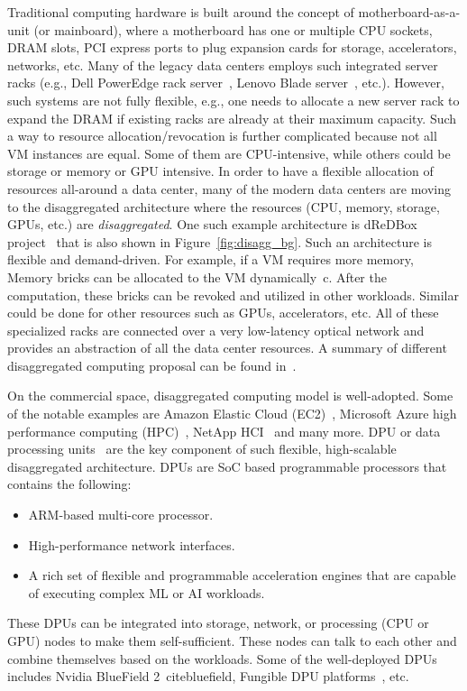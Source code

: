 Traditional computing hardware is built around the concept of motherboard-as-a-unit (or mainboard), where a motherboard has one or multiple CPU sockets, DRAM slots, PCI express ports to plug expansion cards for storage, accelerators, networks, etc. Many of the legacy data centers employs such integrated server racks  (e.g., Dell PowerEdge rack server~\cite{rack_server_dell}, Lenovo Blade server~\cite{rack_server_lenovo}, etc.). However, such systems are not fully flexible, e.g., one needs to allocate a new server rack to expand the DRAM if existing racks are already at their maximum capacity. Such a way to resource allocation/revocation is further complicated because not all VM instances are equal. Some of them are CPU-intensive, while others could be storage or memory or GPU intensive. In order to have a flexible allocation of resources all-around a data center, many of the modern data centers are moving to the disaggregated architecture where the resources (CPU, memory, storage, GPUs, etc.) are \emph{disaggregated}. One such example architecture is dReDBox project~\cite{dis1,dis2} that is also shown in Figure~\ref{fig:disagg_bg}. Such an architecture is flexible and demand-driven. For example, if a VM requires more memory, Memory bricks can be allocated to the VM dynamically~c\cite{lim2009disaggregated}. After the computation, these bricks can be revoked and utilized in other workloads. Similar could be done for other resources such as GPUs, accelerators, etc. All of these specialized racks are connected over a very low-latency optical network and provides an abstraction of all the data center resources. A summary of different disaggregated computing proposal can be found in~\cite{meyer2017disaggregated}.

On the commercial space, disaggregated computing model is well-adopted. Some of the notable examples are Amazon Elastic Cloud (EC2)~\cite{ec2}, Microsoft Azure high performance computing (HPC)~\cite{azure}, NetApp HCI~\cite{netapp} and many more. DPU or data processing units~\cite{dpu} are the key component of such flexible, high-scalable disaggregated architecture. DPUs are SoC based programmable processors that contains the following:

\begin{itemize}
  \item ARM-based multi-core processor.
  \item High-performance network interfaces. 
  \item A rich set of flexible and programmable acceleration engines that are capable of executing complex ML or AI workloads.
\end{itemize}

These DPUs can be integrated into storage, network, or processing (CPU or GPU) nodes to make them self-sufficient. These nodes can talk to each other and combine themselves based on the workloads. Some of the well-deployed DPUs includes Nvidia BlueField 2~cite{bluefield}, Fungible DPU platforms~\cite{fungible}, etc.